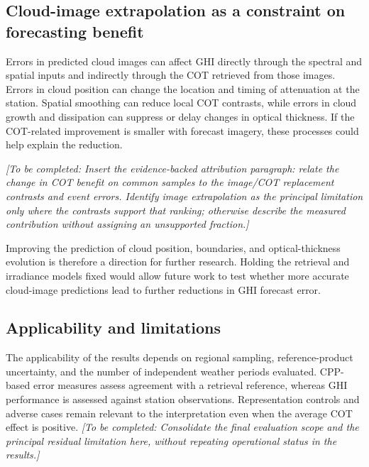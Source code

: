 \documentclass[11pt]{article}
\newcommand{\pending}[1]{\textit{[To be completed: #1]}}
\begin{document}
\subsection{Cloud-image extrapolation as a constraint on forecasting benefit}
Errors in predicted cloud images can affect GHI directly through the spectral and spatial inputs and indirectly through the COT retrieved from those images. Errors in cloud position can change the location and timing of attenuation at the station. Spatial smoothing can reduce local COT contrasts, while errors in cloud growth and dissipation can suppress or delay changes in optical thickness. If the COT-related improvement is smaller with forecast imagery, these processes could help explain the reduction.

\pending{Insert the evidence-backed attribution paragraph: relate the change in COT benefit on common samples to the image/COT replacement contrasts and event errors. Identify image extrapolation as the principal limitation only where the contrasts support that ranking; otherwise describe the measured contribution without assigning an unsupported fraction.}

Improving the prediction of cloud position, boundaries, and optical-thickness evolution is therefore a direction for further research. Holding the retrieval and irradiance models fixed would allow future work to test whether more accurate cloud-image predictions lead to further reductions in GHI forecast error.

\subsection{Applicability and limitations}
The applicability of the results depends on regional sampling, reference-product uncertainty, and the number of independent weather periods evaluated. CPP-based error measures assess agreement with a retrieval reference, whereas GHI performance is assessed against station observations. Representation controls and adverse cases remain relevant to the interpretation even when the average COT effect is positive. \pending{Consolidate the final evaluation scope and the principal residual limitation here, without repeating operational status in the results.}
\end{document}
